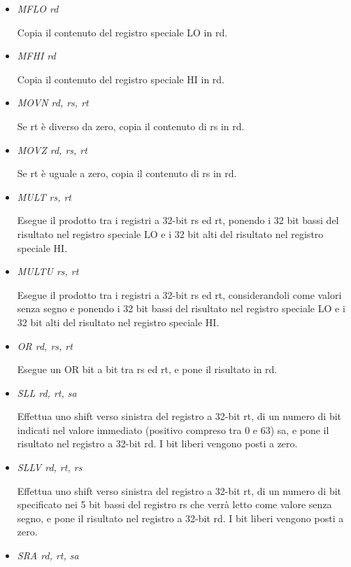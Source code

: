 \documentclass[letterpaper,10pt,italian]{sphinxmanual}
\begin{document}
\begin{itemize}
\item {} 
\emph{MFLO rd}

Copia il contenuto del registro speciale LO in rd.

\item {} 
\emph{MFHI rd}

Copia il contenuto del registro speciale HI in rd.

\item {} 
\emph{MOVN rd, rs, rt}

Se rt è diverso da zero, copia il contenuto di rs in rd.

\item {} 
\emph{MOVZ rd, rs, rt}

Se rt è uguale a zero, copia il contenuto di rs in rd.

\item {} 
\emph{MULT rs, rt}

Esegue il prodotto tra i registri a 32-bit rs ed rt, ponendo i 32 bit bassi
del risultato nel registro speciale LO e i 32 bit alti del risultato nel
registro speciale HI.

\item {} 
\emph{MULTU rs, rt}

Esegue il prodotto tra i registri a 32-bit rs ed rt, considerandoli come
valori senza segno e ponendo i 32 bit bassi del risultato nel registro
speciale LO e i 32 bit alti del risultato nel registro speciale HI.

\item {} 
\emph{OR rd, rs, rt}

Esegue un OR bit a bit tra rs ed rt, e pone il risultato in rd.

\item {} 
\emph{SLL rd, rt, sa}

Effettua uno shift verso sinistra del registro a 32-bit rt, di un numero di
bit indicati nel valore immediato (positivo compreso tra 0 e 63) sa, e pone
il risultato nel registro a 32-bit rd. I bit liberi vengono posti a zero.

\item {} 
\emph{SLLV rd, rt, rs}

Effettua uno shift verso sinistra del registro a 32-bit rt, di un numero di
bit specificato nei 5 bit bassi del registro rs che verrà letto come
valore senza segno, e pone il risultato nel registro a 32-bit rd. I bit
liberi vengono posti a zero.

\item {} 
\emph{SRA rd, rt, sa}


\end{itemize}
\end{document}
